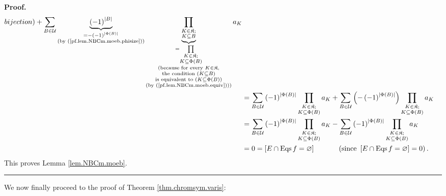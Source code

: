 \documentclass[numbers=enddot,12pt,final,onecolumn,notitlepage]{scrartcl}%
\theoremstyle{definition}
\newenvironment{proof}[1][Proof]{\noindent\textbf{#1.} }{\ \rule{0.5em}{0.5em}}
\newenvironment{verlong}{}{}
\let\sumnonlimits\sum
\let\prodnonlimits\prod
\renewcommand{\sum}{\sumnonlimits\limits}
\renewcommand{\prod}{\prodnonlimits\limits}
\begin{document}
\begin{verlong}
\begin{proof}
\begin{align}
{{{bijection)}}}+\sum_{B\in\mathcal{U}}\underbrace{\left(  -1\right)
^{\left\vert B\right\vert }}_{\substack{=-\left(  -1\right)  ^{\left\vert
\Phi\left(  B\right)  \right\vert }\\\text{(by (\ref{pf.lem.NBCm.moeb.phisize}%
))}}}\underbrace{\prod_{\substack{K\in\mathfrak{K};\\K\subseteq B}%
}}_{\substack{=\prod_{\substack{K\in\mathfrak{K};\\K\subseteq\Phi\left(
B\right)  }}\\\text{(because for every }K\in\mathfrak{K}\text{,}\\\text{the
condition }\left(  K\subseteq B\right)  \\\text{is equivalent to }\left(
K\subseteq\Phi\left(  B\right)  \right)  \\\text{(by
(\ref{pf.lem.NBCm.moeb.equiv})))}}}a_{K}\nonumber\\
&  =\sum_{B\in\mathcal{U}}\left(  -1\right)  ^{\left\vert \Phi\left(
B\right)  \right\vert }\prod_{\substack{K\in\mathfrak{K};\\K\subseteq
\Phi\left(  B\right)  }}a_{K}+\sum_{B\in\mathcal{U}}\left(  -\left(
-1\right)  ^{\left\vert \Phi\left(  B\right)  \right\vert }\right)
\prod_{\substack{K\in\mathfrak{K};\\K\subseteq\Phi\left(  B\right)  }%
}a_{K}\nonumber\\
&  =\sum_{B\in\mathcal{U}}\left(  -1\right)  ^{\left\vert \Phi\left(
B\right)  \right\vert }\prod_{\substack{K\in\mathfrak{K};\\K\subseteq
\Phi\left(  B\right)  }}a_{K}-\sum_{B\in\mathcal{U}}\left(  -1\right)
^{\left\vert \Phi\left(  B\right)  \right\vert }\prod_{\substack{K\in
\mathfrak{K};\\K\subseteq\Phi\left(  B\right)  }}a_{K}\nonumber\\
&  =0=\left[  E\cap\operatorname*{Eqs}f=\varnothing\right]
\ \ \ \ \ \ \ \ \ \ \left(  \text{since }\left[  E\cap\operatorname*{Eqs}%
f=\varnothing\right]  =0\right)  . \label{pf.lem.NBCm.moeb.there}%
\end{align}
This proves Lemma \ref{lem.NBCm.moeb}.
\end{proof}
\end{verlong}

We now finally proceed to the proof of Theorem \ref{thm.chromsym.varis}:
\end{document}
